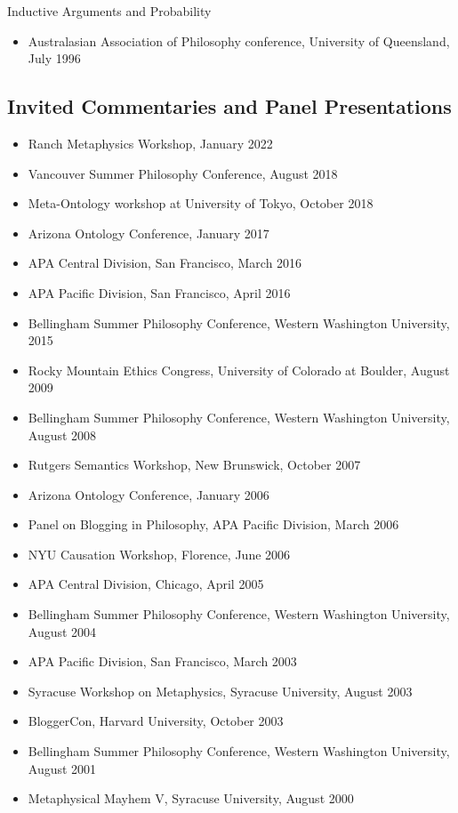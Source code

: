 \documentclass[
  10pt,
  letterpaper,
  DIV=11,
  numbers=noendperiod,
  twoside]{scrartcl}
\providecommand{\tightlist}{%
  \setlength{\itemsep}{0pt}\setlength{\parskip}{0pt}}\usepackage{longtable,booktabs,array}
\begin{document}
Inductive Arguments and Probability

\begin{itemize}
\tightlist
\item
  Australasian Association of Philosophy conference, University of
  Queensland, July 1996
\end{itemize}

\subsection{Invited Commentaries and Panel
Presentations}\label{invited-commentaries-and-panel-presentations}

\begin{itemize}
\tightlist
\item
  Ranch Metaphysics Workshop, January 2022
\item
  Vancouver Summer Philosophy Conference, August 2018
\item
  Meta-Ontology workshop at University of Tokyo, October 2018
\item
  Arizona Ontology Conference, January 2017
\item
  APA Central Division, San Francisco, March 2016
\item
  APA Pacific Division, San Francisco, April 2016
\item
  Bellingham Summer Philosophy Conference, Western Washington
  University, 2015
\item
  Rocky Mountain Ethics Congress, University of Colorado at Boulder,
  August 2009
\item
  Bellingham Summer Philosophy Conference, Western Washington
  University, August 2008
\item
  Rutgers Semantics Workshop, New Brunswick, October 2007
\item
  Arizona Ontology Conference, January 2006
\item
  Panel on Blogging in Philosophy, APA Pacific Division, March 2006
\item
  NYU Causation Workshop, Florence, June 2006
\item
  APA Central Division, Chicago, April 2005
\item
  Bellingham Summer Philosophy Conference, Western Washington
  University, August 2004
\item
  APA Pacific Division, San Francisco, March 2003
\item
  Syracuse Workshop on Metaphysics, Syracuse University, August 2003
\item
  BloggerCon, Harvard University, October 2003
\item
  Bellingham Summer Philosophy Conference, Western Washington
  University, August 2001
\item
  Metaphysical Mayhem V, Syracuse University, August 2000
\end{itemize}
\end{document}

